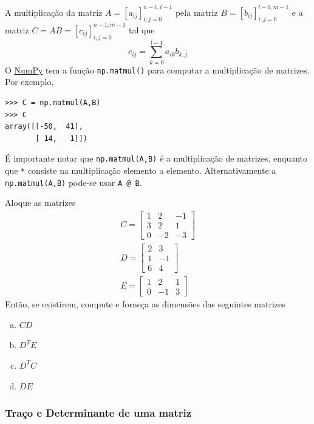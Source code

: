 \documentclass[12pt]{article}
\begin{document}
A multiplicação da matriz $A = [a_{ij}]_{i,j=0}^{n-1,l-1}$ pela matriz $B = [b_{ij}]_{i,j=0}^{l-1,m-1}$ e a matriz $C = AB = [c_{ij}]_{i,j=0}^{n-1,m-1}$ tal que
\begin{equation}
  c_{ij} = \sum_{k=0}^{l-1} a_{ik}b_{k,j}
\end{equation}
O \href{https://numpy.org/}{NumPy} tem a função \lstinline+np.matmul()+ para computar a multiplicação de matrizes. Por exemplo,

\begin{lstlisting}
>>> C = np.matmul(A,B)
>>> C
array([[-50,  41],
       [ 14,   1]])
\end{lstlisting}

\begin{obs}
  É importante notar que \lstinline+np.matmul(A,B)+ é a multiplicação de matrizes, enquanto que \lstinline+*+ consiste na multiplicação elemento a elemento. Alternativamente a \lstinline+np.matmul(A,B)+ pode-se usar \lstinline+A @ B+.
\end{obs}

\begin{exr}
  Aloque as matrizes
  \begin{gather}
    C =
    \begin{bmatrix}
      1 & 2 & -1 \\
      3 & 2 & 1 \\
      0 & -2 & -3
    \end{bmatrix}\\
    D =
    \begin{bmatrix}
      2 & 3 \\
      1 & -1 \\
      6 & 4
    \end{bmatrix}\\
    E =
    \begin{bmatrix}
      1 & 2 & 1 \\
      0 & -1 & 3
    \end{bmatrix}
  \end{gather}
  Então, se existirem, compute e forneça as dimensões das seguintes matrizes
  \begin{enumerate}[a)]
  \item $CD$
  \item $D^TE$
  \item $D^TC$
  \item $DE$
  \end{enumerate}
\end{exr}

\subsubsection{Traço e Determinante de uma matriz}
\end{document}
